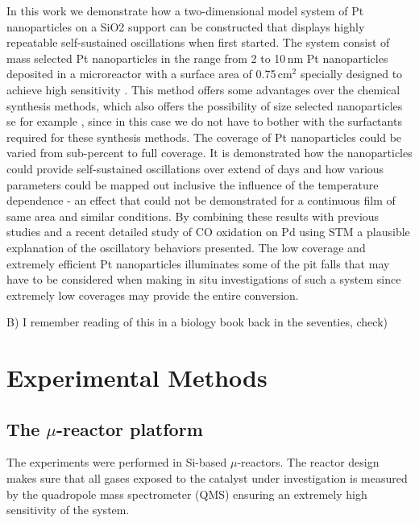 \documentclass[journal=jacsat,manuscript=article]{achemso}
\begin{document}
In this work we demonstrate how a two-dimensional model system of Pt
nanoparticles on a SiO2 support can be constructed that displays highly
repeatable self-sustained oscillations when first started. The system consist
of mass selected Pt nanoparticles in the range from 2 to 10\,nm Pt
nanoparticles deposited in a microreactor with a surface area of 0.75\,cm$^2$
specially designed to achieve high sensitivity \cite{Henriksen2009}. This
method offers some advantages over the chemical synthesis methods, which also
offers the possibility of size selected nanoparticles se for example 
\cite{Tsang2008,Shao2011}, since in this case we do not have to bother with
the surfactants required for these synthesis methods. The coverage of Pt
nanoparticles could be varied from sub-percent to full coverage. It is
demonstrated how the nanoparticles could provide self-sustained oscillations
over extend of days and how various parameters could be mapped out inclusive
the influence of the temperature dependence - an effect that could not be
demonstrated for a continuous film of same area and similar conditions. By
combining these results with previous studies \cite{Carlsson2006,Singh2010}
and a recent detailed study of CO oxidation on Pd using STM
\cite{Hendriksen2010} a plausible explanation of the oscillatory behaviors
presented. The low coverage and extremely efficient Pt nanoparticles
illuminates some of the pit falls that may have to be considered when making
in situ investigations of such a system since extremely low coverages may
provide the entire conversion.

B) I remember reading of this in a biology book back in the seventies, check)

\section{Experimental Methods}
\subsection{The $\mu$-reactor platform}
The experiments were performed in Si-based $\mu$-reactors\cite{Henriksen2009}. The reactor design makes sure that all gases exposed to the catalyst under investigation is measured by the quadropole mass spectrometer (QMS) ensuring an extremely high sensitivity of the system. 
\end{document}
